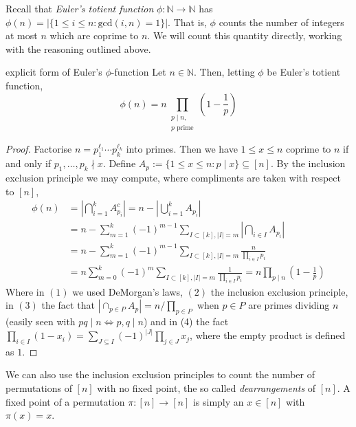 \documentclass{article}
\begin{document}
Recall that {\it Euler's totient function} $\phi: \mathbb{N} \to \mathbb{N}$ has $\phi(n) = |\{1 \leq i \leq n : \text{gcd}(i, n) = 1\}|$. 
That is, $\phi$ counts the number of integers at most $n$ which are coprime to $n$. We will count this quantity directly, working with 
the reasoning outlined above.

\begin{proposition}[]{explicit form of Euler's $\phi$-function}
    Let $n \in \mathbb{N}$. Then, letting $\phi$ be Euler's totient function, 
    \[\phi(n) = n \! \! \! \prod_{\substack{p \mid n, \\ p \text{ prime}}} \! \! \! \left(1 - \frac{1}{p}\right)\]
\end{proposition}

\begin{proof}
    Factorise $n = p_1^{\ell_1} \cdots p_k^{\ell_k}$ into primes. Then we have $1 \leq x \leq n$ coprime to $n$ 
    if and only if $p_1, \dots, p_k \nmid x$. Define $A_p := \{1 \leq x \leq n : p \mid x\} \subseteq [n]$. 
    By the inclusion exclusion principle we may compute, where compliments are taken with respect to $[n]$, 
    \begin{align*}
        \phi(n) &= \left|\bigcap_{i=1}^kA_{p_i}^c\right| = n - \left|\bigcup_{i=1}^k A_{p_i}\right| \tag{1}\\
        &= n - \sum_{m = 1}^k (-1)^{m-1} \sum_{I \subset [k], |I| = m}\left|\bigcap_{i \in I}A_{p_i}\right| \tag{2}\\
        &= n - \sum_{m = 1}^k (-1)^{m-1} \sum_{I \subset [k], |I| = m}\frac{n}{\prod_{i \in I}p_i} \tag{3}\\
        &= n\sum_{m = 0}^k (-1)^{m} \sum_{I \subset [k], |I| = m}\frac{1}{\prod_{i \in I}p_i} \tag{4}
        = n\prod_{p \mid n}\left(1 - \frac{1}{p}\right)
    \end{align*}
    Where in $(1)$ we used DeMorgan's laws, $(2)$ the inclusion exclusion principle, in $(3)$ the fact that 
    $|\cap_{p \in P}A_p| = n/\prod_{p \in P}$ when $p \in P$ are primes dividing $n$ (easily seen with 
    $pq \mid n \Leftrightarrow p,q \mid n$) and in (4) the fact $\prod_{i \in I}(1-x_i) = \sum_{J \subseteq I}(-1)^{|J|}\prod_{j \in J}x_j$, 
    where the empty product is defined as $1$. 
\end{proof}

We can also use the inclusion exclusion principles to count the number of permutations of $[n]$ with no fixed point, 
the so called {\it dearrangements} of $[n]$. A fixed point of a permutation $\pi:[n] \to [n]$ is simply an 
$x \in [n]$ with $\pi(x) = x$. 
\end{document}
